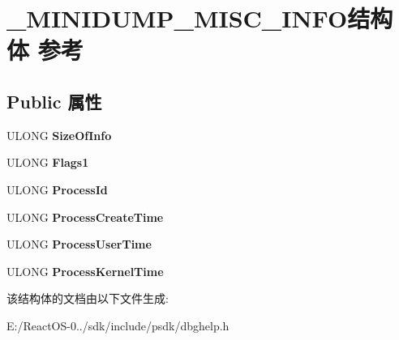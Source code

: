 \hypertarget{struct___m_i_n_i_d_u_m_p___m_i_s_c___i_n_f_o}{}\section{\+\_\+\+M\+I\+N\+I\+D\+U\+M\+P\+\_\+\+M\+I\+S\+C\+\_\+\+I\+N\+F\+O结构体 参考}
\label{struct___m_i_n_i_d_u_m_p___m_i_s_c___i_n_f_o}
\subsection*{Public 属性}
\begin{DoxyCompactItemize}
\item 
\mbox{\label{struct___m_i_n_i_d_u_m_p___m_i_s_c___i_n_f_o_ad88191f2c0ea08f23e9c49548eff6d7d}} 
U\+L\+O\+NG {\bfseries Size\+Of\+Info}
\item 
\mbox{\label{struct___m_i_n_i_d_u_m_p___m_i_s_c___i_n_f_o_ae420f7a6772fda6423b9b70f037f4b66}} 
U\+L\+O\+NG {\bfseries Flags1}
\item 
\mbox{\label{struct___m_i_n_i_d_u_m_p___m_i_s_c___i_n_f_o_af72b2b9b6f07428d025ef152e8308e5a}} 
U\+L\+O\+NG {\bfseries Process\+Id}
\item 
\mbox{\label{struct___m_i_n_i_d_u_m_p___m_i_s_c___i_n_f_o_a9317b752b03aec74061daad65db40355}} 
U\+L\+O\+NG {\bfseries Process\+Create\+Time}
\item 
\mbox{\label{struct___m_i_n_i_d_u_m_p___m_i_s_c___i_n_f_o_a942887f0e84d9d97e9d00831106f6f9a}} 
U\+L\+O\+NG {\bfseries Process\+User\+Time}
\item 
\mbox{\label{struct___m_i_n_i_d_u_m_p___m_i_s_c___i_n_f_o_ac226414be4a48251b25f30ea3b5b1efd}} 
U\+L\+O\+NG {\bfseries Process\+Kernel\+Time}
\end{DoxyCompactItemize}


该结构体的文档由以下文件生成\+:\begin{DoxyCompactItemize}
\item 
E\+:/\+React\+O\+S-\/0../sdk/include/psdk/dbghelp.\+h\end{DoxyCompactItemize}

